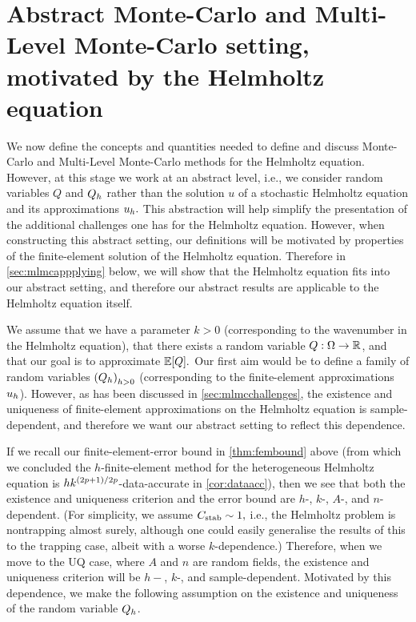 \section{Abstract Monte-Carlo and Multi-Level Monte-Carlo setting, motivated by the Helmholtz equation}\label{sec:mlmcsetup}
We now define the concepts and quantities needed to define and discuss Monte-Carlo and Multi-Level Monte-Carlo methods for the Helmholtz equation. However, at this stage we work at an abstract level, i.e., we consider random variables $Q$ and $Q_{h}$ rather than the solution $u$ of a stochastic Helmholtz equation and its approximations $u_{h}.$ This abstraction will help simplify the presentation of the additional challenges one has for the Helmholtz equation. However, when constructing this abstract setting, our definitions will be motivated by properties of the finite-element solution of the Helmholtz equation. Therefore in \cref{sec:mlmcappplying} below, we will show that the Helmholtz equation fits into our abstract setting, and therefore our abstract results are applicable to the Helmholtz equation itself.

We assume that we have a parameter $k>0$ (corresponding to the wavenumber in the Helmholtz equation), that there exists a random variable $Q:\Omega\rightarrow\mathbb R$, and that our goal is to approximate $\EXP{Q}.$ Our first aim would be to define a family of random variables $\mleft(\Qh\mright)_{h>0}$ (corresponding to the finite-element approximations $u_{h}$). However, as has been discussed in \cref{sec:mlmcchallenges}, the existence and uniqueness of finite-element approximations on the Helmholtz equation is sample-dependent, and therefore we want our abstract setting to reflect this dependence.

If we recall our finite-element-error bound in \cref{thm:fembound} above (from which we concluded the $h$-finite-element method for the heterogeneous Helmholtz equation is $hk^{(2p+1)/2p}$-data-accurate in \cref{cor:dataacc}), then we see that both the existence and uniqueness criterion and the error bound are $h$-, $k$-, $A$-, and $n$-dependent. (For simplicity, we assume $C_{\mathrm{stab}} \sim 1,$ i.e., the Helmholtz problem is nontrapping almost surely, although one could easily generalise the results of this  to the trapping case, albeit with a worse $k$-dependence.) Therefore, when we move to the UQ case, where $A$ and $n$ are random fields, the existence and uniqueness criterion will be $h-$, $k$-, and sample-dependent. Motivated by this dependence, we make the following assumption on the existence and uniqueness of the random variable $Q_{h}$.


